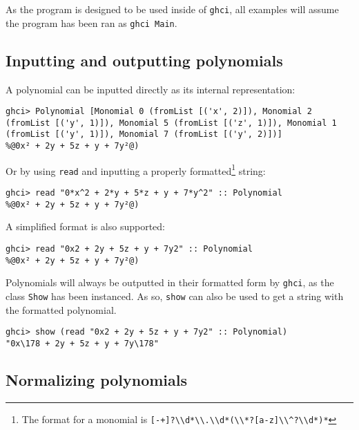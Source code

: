 \documentclass[11pt,a4paper]{article}
\begin{document}
As the program is designed to be used inside of \lstinline{ghci}, all examples will assume the program has been ran as \lstinline{ghci Main}.

\subsection{Inputting and outputting polynomials}

A polynomial can be inputted directly as its internal representation:

\begin{lstlisting}
ghci> Polynomial [Monomial 0 (fromList [('x', 2)]), Monomial 2 (fromList [('y', 1)]), Monomial 5 (fromList [('z', 1)]), Monomial 1 (fromList [('y', 1)]), Monomial 7 (fromList [('y', 2)])]
%@0x² + 2y + 5z + y + 7y²@)
\end{lstlisting}

Or by using \lstinline{read} and inputting a properly formatted\footnote{The format for a monomial is \lstinline{[-+]?\\d*\\.\\d*(\\*?[a-z]\\^?\\d*)*}} string:

\begin{lstlisting}
ghci> read "0*x^2 + 2*y + 5*z + y + 7*y^2" :: Polynomial
%@0x² + 2y + 5z + y + 7y²@)
\end{lstlisting}

A simplified format is also supported:

\begin{lstlisting}
ghci> read "0x2 + 2y + 5z + y + 7y2" :: Polynomial
%@0x² + 2y + 5z + y + 7y²@)
\end{lstlisting}

Polynomials will always be outputted in their formatted form by \lstinline{ghci}, as the class \lstinline{Show} has been instanced.
As so, \lstinline{show} can also be used to get a string with the formatted polynomial.

\begin{lstlisting}
ghci> show (read "0x2 + 2y + 5z + y + 7y2" :: Polynomial)
"0x\178 + 2y + 5z + y + 7y\178"
\end{lstlisting}

\subsection{Normalizing polynomials}
\end{document}
